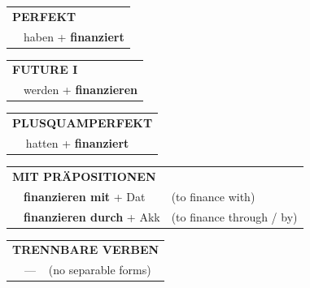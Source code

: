 \documentclass[10pt,a4paper]{revtex4-2}
\begin{document}
\begin{verbbox}
\vspace{10pt}

\begin{tabular}{rl}
\multicolumn{2}{l}{\textbf{PERFEKT}}\\
& haben + \textbf{finanziert}\\
\end{tabular}
\hfill
\begin{tabular}{rl}
\multicolumn{2}{l}{\textbf{FUTURE I}}\\
& werden + \textbf{finanzieren}\\
\end{tabular}
\hfill
\begin{tabular}{rl}
\multicolumn{2}{l}{\textbf{PLUSQUAMPERFEKT}}\\
& hatten + \textbf{finanziert}\\
\end{tabular}

\vspace{10pt}

\begin{tabular}{lll}
\multicolumn{3}{l}{\textbf{MIT PRÄPOSITIONEN}}\\
& \textbf{finanzieren mit} + Dat & (to finance with)\\
& \textbf{finanzieren durch} + Akk & (to finance through / by)\\
\end{tabular}
\hfill
\begin{tabular}{lll}
\multicolumn{3}{l}{\textbf{TRENNBARE VERBEN}}\\
& --- & (no separable forms)\\
\end{tabular}
\vspace{-5pt}
\end{verbbox}
\end{document}
